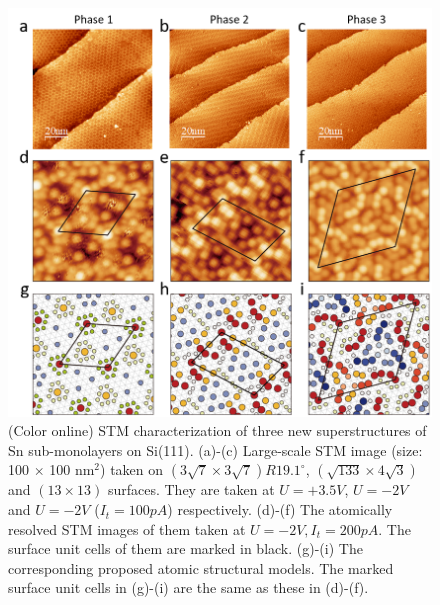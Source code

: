 \documentclass[aps,prb,amsfonts,amsmath,amssymb,showpacs,groupedaddress,superscriptaddress]{revtex4-1}
\begin{document}
\begin{figure}[p]
    \includegraphics[width=\columnwidth]{fig/STMTopographicImage.png}
    \caption{\label{fig:STMTopographicImage}(Color online) STM characterization of three new superstructures of Sn sub-monolayers on Si(111). (a)-(c) Large-scale STM image (size: 100 $\times$ 100 nm$^2$) taken on $(3\sqrt{7} \times 3\sqrt{7})R19.1^\circ$, $(\sqrt{133} \times 4\sqrt{3})$ and $(13 \times 13)$ surfaces. They are taken at $U = +3.5V$, $U = -2V$ and $U = -2V$ ($I_{t} = 100pA$) respectively. (d)-(f) The atomically resolved STM images of them taken at $U = -2V, I_{t} = 200pA$. The surface unit cells of them are marked in black. (g)-(i) The corresponding proposed atomic structural models. The marked surface unit cells in (g)-(i) are the same as these in (d)-(f).}
\end{figure}
\end{document}
